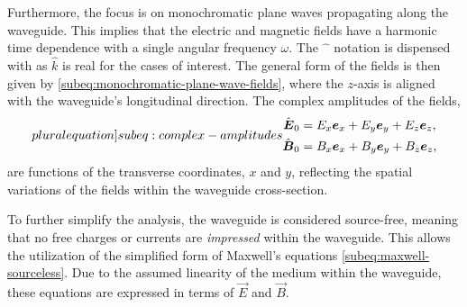 \documentclass[14pt,a4paper]{ntust_report}
\begin{document}
Furthermore, the focus is on monochromatic plane waves propagating along the waveguide. This implies that the electric and magnetic fields have a harmonic time dependence with a single angular frequency $\omega$. The $\hat{\phantom{x}}$ notation is dispensed with as $\hat k$ is real for the cases of interest. The general form of the fields is then given by \cref{subeq:monochromatic-plane-wave-fields}, where the $z$-axis is aligned with the waveguide's longitudinal direction. The complex amplitudes of the fields,\\
\begin{subequations}
    \label[pluralequation]{subeq:complex-amplitudes}
    \begin{align}
        \label{subeq:complex-amplitude-e}
        \hat{\vec E}_0 &= E_x\vec e_x + E_y\vec e_y + E_z\vec e_z,
    \\
        \label{subeq:complex-amplitude-b}
        \hat{\vec B}_0 &= B_x\vec e_x + B_y\vec e_y + B_z\vec e_z,
    \end{align}
\end{subequations}
are functions of the transverse coordinates, $x$ and $y$, reflecting the spatial variations of the fields within the waveguide cross-section.

To further simplify the analysis, the waveguide is considered source-free, meaning that no free charges or currents are \emph{impressed} within the waveguide. This allows the utilization of the simplified form of Maxwell's equations \eqref{subeq:maxwell-sourceless}. Due to the assumed linearity of the medium within the waveguide, these equations are expressed in terms of $\vec E$ and $\vec B$.
\end{document}
